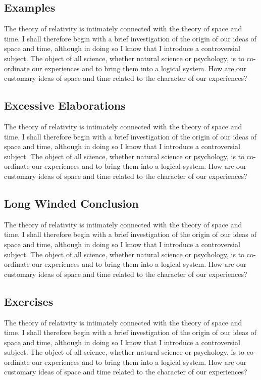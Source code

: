 \documentclass{book}
\begin{document}
\subsection{Examples}

The theory of relativity is intimately connected
with the theory of space and time. I shall therefore begin with a brief
investigation of the origin of our ideas of space and time, although in
doing so I know that I introduce a controversial subject. The object of all
science, whether natural science or psychology, is to co-ordinate our
experiences and to bring them into a logical system. How are our customary
ideas of space and time related to the character of our experiences?

\subsection{Excessive Elaborations}

The theory of relativity is intimately connected
with the theory of space and time. I shall therefore begin with a brief
investigation of the origin of our ideas of space and time, although in
doing so I know that I introduce a controversial subject. The object of all
science, whether natural science or psychology, is to co-ordinate our
experiences and to bring them into a logical system. How are our customary
ideas of space and time related to the character of our experiences?

\subsection{Long Winded Conclusion}

The theory of relativity is intimately connected
with the theory of space and time. I shall therefore begin with a brief
investigation of the origin of our ideas of space and time, although in
doing so I know that I introduce a controversial subject. The object of all
science, whether natural science or psychology, is to co-ordinate our
experiences and to bring them into a logical system. How are our customary
ideas of space and time related to the character of our experiences?

\subsection{Exercises}

The theory of relativity is intimately connected
with the theory of space and time. I shall therefore begin with a brief
investigation of the origin of our ideas of space and time, although in
doing so I know that I introduce a controversial subject. The object of all
science, whether natural science or psychology, is to co-ordinate our
experiences and to bring them into a logical system. How are our customary
ideas of space and time related to the character of our experiences?
\end{document}
